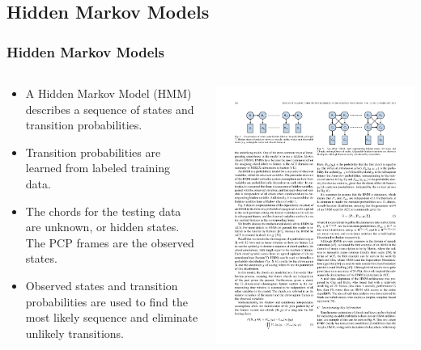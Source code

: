 \documentclass{beamer}
\begin{document}
\subsection{Hidden Markov Models}

\begin{frame}
	\frametitle{Hidden Markov Models}
	\begin{columns}
	\begin{column}{.6\textwidth}
		\begin{itemize}
			\item A Hidden Markov Model (HMM) describes a sequence of states and transition probabilities.
			\item Transition probabilities are learned from labeled training data.
			\item The chords for the testing data are unknown, or hidden states. The PCP frames are the observed states.
			\item Observed states and transition probabilities are used to find the most likely sequence and eliminate unlikely transitions.
		\end{itemize}
	\end{column}
	\begin{column}{.4\textwidth}
		\includegraphics[width=.95\textwidth]{hmm.pdf}
	\end{column}
	\end{columns}
\end{frame}
\end{document}
